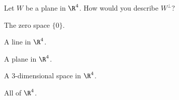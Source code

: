 \begin{frame}
\end{frame}



\begin{pollframe}

\vskip 1cm

\begin{bluebox}[Poll]{.8\linewidth}
  Let $W$ be a plane in $\R^4$.  How would you describe $W^\perp$?
  \smallskip
  \begin{eAlpherate}
  \item The zero space $\{0\}$.
  \item A line in $\R^4$.
  \item A plane in $\R^4$.
  \item A $3$-dimensional space in $\R^4$.
  \item All of $\R^4$.
  \end{eAlpherate}
\end{bluebox}

\end{pollframe}



